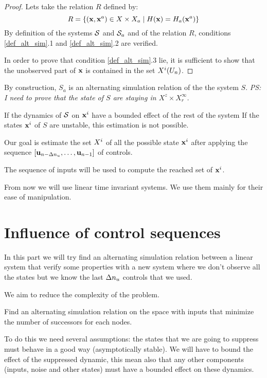 \begin{proof}
Lets take the relation $R$ defined by:
\begin{equation}
R = \{ ( \mathbf{x}, \mathbf{x}^a) \in X \times X_a \mid H( \mathbf{x}) = H_a( \mathbf{x}^a) \}
\end{equation}
By definition of the systems $\mathcal{S}$ and $\mathcal{S}_a$ and of the relation $R$, conditions \ref{def_alt_sim}.1 and \ref{def_alt_sim}.2 are verified.

In order to prove that condition \ref{def_alt_sim}.3 lie, it is sufficient to show that the unobserved part of $ \mathbf{x}$ is contained in the set $X^i(U_n)$.
\end{proof}

By construction, $S_a$ is an alternating simulation relation of the the system $S$.
\textit{PS: I need to prove that the state of $S$ are staying in $X^z \times X^\infty_r$.}

If the dynamics of $\mathcal{S}$ on $ \mathbf{x}^i$ have a bounded effect of the rest of the system 
If the states $ \mathbf{x}^i$ of $S$ are unstable, this estimation is not possible.

Our goal is estimate the set $X^i$ of all the possible state $ \mathbf{x}^i$ after applying the sequence $[ \mathbf{u}_{n-\Delta n_u},\dots, \mathbf{u}_{n-1}]$ of controls.


The sequence of inputs will be used to compute the reached set of $ \mathbf{x}^i$.

From now we will use linear time invariant systems. We use them mainly for their ease of manipulation.

\section{Influence of control sequences}
In this part we will try find an alternating simulation relation between a linear system that verify some properties with a new system where we don't observe all the states but we know the last $\Delta n_u$ controls that we used.

We aim to reduce the complexity of the problem.

\begin{problem}
Find an alternating simulation relation on the space with inputs that minimize the number of successors for each nodes.
\end{problem}

To do this we need several assumptions: the states that we are going to suppress must behave in a good way (asymptotically stable).
We will have to bound the effect of the suppressed dynamic, this mean also that any other components (inputs, noise and other states) must have a bounded effect on these dynamics.

